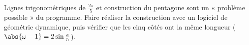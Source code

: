 \begin{teachernote}
Lignes trigonométriques de $\frac{2\pi}5$ et construction du pentagone sont un « problème possible » du programme. Faire réaliser la construction avec un logiciel de géométrie dynamique, puis vérifier que les cinq côtés ont la même longueur ($\abs{\omega-1}=2\sin\frac\pi5$).
\end{teachernote}
